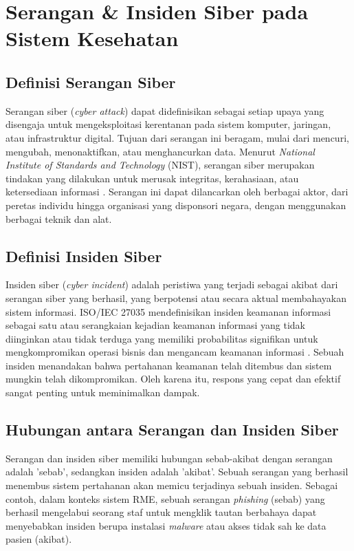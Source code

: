 \section{Serangan \& Insiden Siber pada Sistem Kesehatan}

\subsection{Definisi Serangan Siber}
Serangan siber (\textit{cyber attack}) dapat didefinisikan sebagai setiap upaya yang disengaja untuk mengeksploitasi kerentanan pada sistem komputer, jaringan, atau infrastruktur digital. Tujuan dari serangan ini beragam, mulai dari mencuri, mengubah, menonaktifkan, atau menghancurkan data. Menurut \textit{National Institute of Standards and Technology} (NIST), serangan siber merupakan tindakan yang dilakukan untuk merusak integritas, kerahasiaan, atau ketersediaan informasi \cite{13}. Serangan ini dapat dilancarkan oleh berbagai aktor, dari peretas individu hingga organisasi yang disponsori negara, dengan menggunakan berbagai teknik dan alat.

\subsection{Definisi Insiden Siber}
Insiden siber (\textit{cyber incident}) adalah peristiwa yang terjadi sebagai akibat dari serangan siber yang berhasil, yang berpotensi atau secara aktual membahayakan sistem informasi. ISO/IEC 27035 mendefinisikan insiden keamanan informasi sebagai satu atau serangkaian kejadian keamanan informasi yang tidak diinginkan atau tidak terduga yang memiliki probabilitas signifikan untuk mengkompromikan operasi bisnis dan mengancam keamanan informasi \cite{18}. Sebuah insiden menandakan bahwa pertahanan keamanan telah ditembus dan sistem mungkin telah dikompromikan. Oleh karena itu, respons yang cepat dan efektif sangat penting untuk meminimalkan dampak.

\subsection{Hubungan antara Serangan dan Insiden Siber}
Serangan dan insiden siber memiliki hubungan sebab-akibat dengan serangan adalah 'sebab', sedangkan insiden adalah 'akibat'. Sebuah serangan yang berhasil menembus sistem pertahanan akan memicu terjadinya sebuah insiden. Sebagai contoh, dalam konteks sistem RME, sebuah serangan \textit{phishing} (sebab) yang berhasil mengelabui seorang staf untuk mengklik tautan berbahaya dapat menyebabkan insiden berupa instalasi \textit{malware} atau akses tidak sah ke data pasien (akibat).